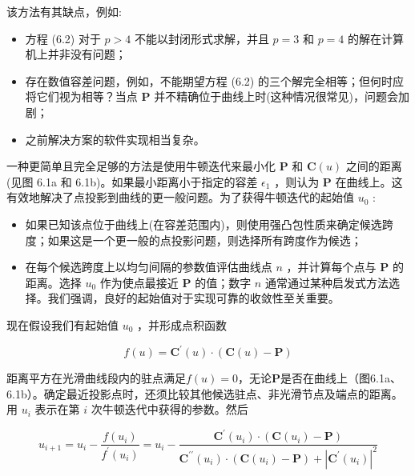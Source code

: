 \documentclass[../main.tex]{subfiles}
\begin{document}
该方法有其缺点，例如:

\begin{itemize}
\item 方程 (6.2) 对于 \(p > 4\) 不能以封闭形式求解，并且 \(p = 3\) 和 \(p = 4\) 的解在计算机上并非没有问题；
\end{itemize}

\begin{itemize}
\item 存在数值容差问题，例如，不能期望方程 (6.2) 的三个解完全相等；但何时应将它们视为相等？当点 \(\mathbf{P}\) 并不精确位于曲线上时(这种情况很常见)，问题会加剧；
\end{itemize}

\begin{itemize}
\item 之前解决方案的软件实现相当复杂。
\end{itemize}

一种更简单且完全足够的方法是使用牛顿迭代来最小化 \(\mathbf{P}\) 和 \(\mathbf{C}\left( u\right)\) 之间的距离(见图 6.1a 和 6.1b)。如果最小距离小于指定的容差 \({\epsilon }_{1}\) ，则认为 \(\mathbf{P}\) 在曲线上。这有效地解决了点投影到曲线的更一般问题。为了获得牛顿迭代的起始值 \({u}_{0}\) :

\begin{itemize}
\item 如果已知该点位于曲线上(在容差范围内)，则使用强凸包性质来确定候选跨度；如果这是一个更一般的点投影问题，则选择所有跨度作为候选；
\end{itemize}

\begin{itemize}
\item 在每个候选跨度上以均匀间隔的参数值评估曲线点 \(n\) ，并计算每个点与 \(\mathbf{P}\) 的距离。选择 \({u}_{0}\) 作为使点最接近 \(\mathbf{P}\) 的值；数字 \(n\) 通常通过某种启发式方法选择。我们强调，良好的起始值对于实现可靠的收敛性至关重要。
\end{itemize}

现在假设我们有起始值 \({u}_{0}\) ，并形成点积函数

\[
f\left( u\right)  = {\mathbf{C}}^{\prime }\left( u\right)  \cdot  \left( {\mathbf{C}\left( u\right)  - \mathbf{P}}\right)
\]

距离平方在光滑曲线段内的驻点满足\(f(u)=0\)，无论\(\mathbf P\)是否在曲线上（图6.1a、6.1b）。确定最近投影点时，还须比较其他候选驻点、非光滑节点及端点的距离。用 \({u}_{i}\) 表示在第 \(i\) 次牛顿迭代中获得的参数。然后

\[
{u}_{i + 1} = {u}_{i} - \frac{f\left( {u}_{i}\right) }{{f}^{\prime }\left( {u}_{i}\right) } = {u}_{i} - \frac{{\mathbf{C}}^{\prime }\left( {u}_{i}\right)  \cdot  \left( {\mathbf{C}\left( {u}_{i}\right)  - \mathbf{P}}\right) }{{\mathbf{C}}^{\prime \prime }\left( {u}_{i}\right)  \cdot  \left( {\mathbf{C}\left( {u}_{i}\right)  - \mathbf{P}}\right)  + {\left| {\mathbf{C}}^{\prime }\left( {u}_{i}\right) \right| }^{2}} \tag{6.3}
\]
\end{document}

